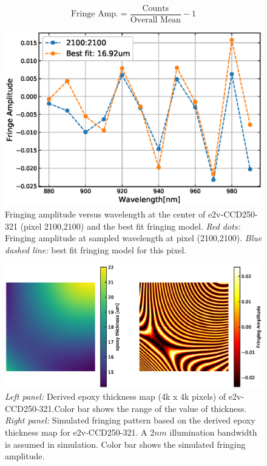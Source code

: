 \documentclass[twocolumn]{aastex63} %
\begin{document}
\begin{CJK*}{UTF8}{gbsn}
\begin{equation}
    \mbox{Fringe\ Amp.} = \frac{\mbox{Counts}}{\mbox{Overall\ Mean}}- 1
\end{equation}
\begin{figure}[tb]
\centering
\includegraphics[scale = 0.45]{fit_example.eps}
\caption{Fringing amplitude versus wavelength at the center of e2v-CCD250-321 (pixel 2100,2100) and the best fit fringing model. {\it Red dots:} Fringing amplitude at sampled wavelength at pixel (2100,2100). {\it Blue dashed line:} best fit fringing model for this pixel.} 
\label{fig:Fitting_exmaple}
\end{figure}

\begin{figure}[hbt]
\centering
\includegraphics[scale = 0.6]{e2v-321-map_sim.eps}
\caption{{\it Left panel:} Derived epoxy thickness map (4k x 4k pixels) of e2v-CCD250-321.Color bar shows the range of the value of thickness. {\it Right panel:} Simulated fringing pattern based on the derived epoxy thickness map for e2v-CCD250-321. A $2nm$ illumination bandwidth is assumed in simulation. Color bar shows the simulated fringing amplitude.}
\label{fig:321-map-simulation}
\end{figure}


\end{CJK*}
\end{document}
